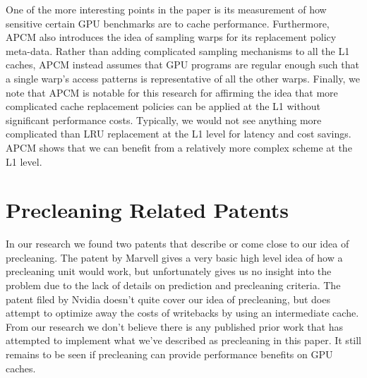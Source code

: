 One of the more interesting points in the paper is its measurement of how sensitive certain GPU benchmarks are to cache performance. Furthermore, APCM also introduces the idea of sampling warps for its replacement policy meta-data. Rather than adding complicated sampling mechanisms to all the L1 caches, APCM instead assumes that GPU programs are regular enough such that a single warp's access patterns is representative of all the other warps. Finally, we note that APCM is notable for this research for affirming the idea that more complicated cache replacement policies can be applied at the L1 without significant performance costs. Typically, we would not see anything more complicated than LRU replacement at the L1 level for latency and cost savings. APCM shows that we can benefit from a relatively more complex scheme at the L1 level.

\section{Precleaning Related Patents}
In our research we found two patents that describe or come close to our idea of precleaning. The patent by Marvell \cite{preclean_cpu} gives a very basic high level idea of how a precleaning unit would work, but unfortunately gives us no insight into the problem due to the lack of details on prediction and precleaning criteria. The patent filed by Nvidia \cite{preclean_nvidia_patent} doesn't quite cover our idea of precleaning, but does attempt to optimize away the costs of writebacks by using an intermediate cache. From our research we don't believe there is any published prior work that has attempted to implement what we've described as precleaning in this paper. It still remains to be seen if precleaning can provide performance benefits on GPU caches.
